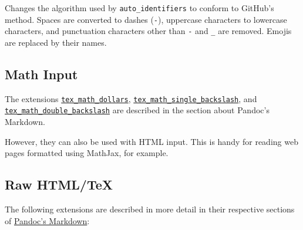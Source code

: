 \documentclass[
]{article}
\begin{document}
Changes the algorithm used by \texttt{auto\_identifiers} to conform to
GitHub's method. Spaces are converted to dashes (\texttt{-}), uppercase
characters to lowercase characters, and punctuation characters other
than \texttt{-} and \texttt{\_} are removed. Emojis are replaced by
their names.

\hypertarget{math-input}{%
\subsection{Math Input}\label{math-input}}

The extensions
\protect\hyperlink{extension-tex_math_dollars}{\texttt{tex\_math\_dollars}},
\protect\hyperlink{extension-tex_math_single_backslash}{\texttt{tex\_math\_single\_backslash}},
and
\protect\hyperlink{extension-tex_math_double_backslash}{\texttt{tex\_math\_double\_backslash}}
are described in the section about Pandoc's Markdown.

However, they can also be used with HTML input. This is handy for
reading web pages formatted using MathJax, for example.

\hypertarget{raw-htmltex}{%
\subsection{Raw HTML/TeX}\label{raw-htmltex}}

The following extensions are described in more detail in their
respective sections of \protect\hyperlink{pandocs-markdown}{Pandoc's
Markdown}:
\end{document}
